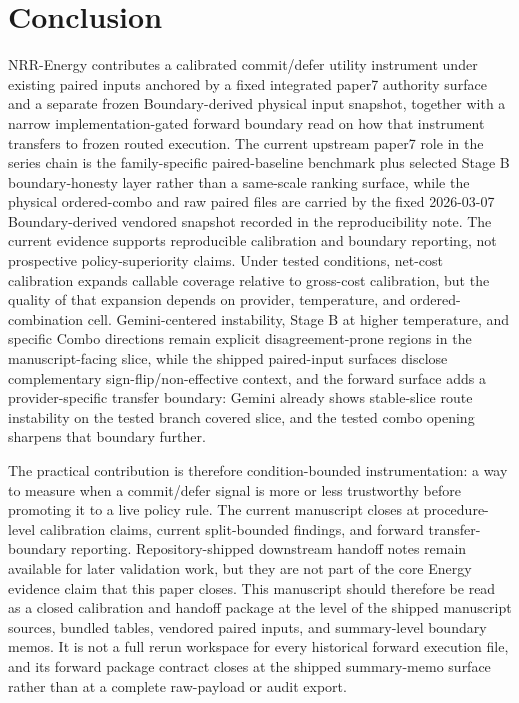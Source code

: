 \documentclass[11pt,a4paper]{article}
\begin{document}
\section{Conclusion}
\label{sec:conclusion}

NRR-Energy contributes a calibrated commit/defer utility instrument under existing paired inputs anchored by a fixed integrated paper7 authority surface and a separate frozen Boundary-derived physical input snapshot, together with a narrow implementation-gated forward boundary read on how that instrument transfers to frozen routed execution. The current upstream paper7 role in the series chain is the family-specific paired-baseline benchmark plus selected Stage B boundary-honesty layer rather than a same-scale ranking surface, while the physical ordered-combo and raw paired files are carried by the fixed 2026-03-07 Boundary-derived vendored snapshot recorded in the reproducibility note. The current evidence supports reproducible calibration and boundary reporting, not prospective policy-superiority claims. Under tested conditions, net-cost calibration expands callable coverage relative to gross-cost calibration, but the quality of that expansion depends on provider, temperature, and ordered-combination cell. Gemini-centered instability, Stage B at higher temperature, and specific Combo directions remain explicit disagreement-prone regions in the manuscript-facing slice, while the shipped paired-input surfaces disclose complementary sign-flip/non-effective context, and the forward surface adds a provider-specific transfer boundary: Gemini already shows stable-slice route instability on the tested branch covered slice, and the tested combo opening sharpens that boundary further.

The practical contribution is therefore condition-bounded instrumentation: a way to measure when a commit/defer signal is more or less trustworthy before promoting it to a live policy rule. The current manuscript closes at procedure-level calibration claims, current split-bounded findings, and forward transfer-boundary reporting. Repository-shipped downstream handoff notes remain available for later validation work, but they are not part of the core Energy evidence claim that this paper closes.
This manuscript should therefore be read as a closed calibration and handoff package
at the level of the shipped manuscript sources, bundled tables, vendored paired
inputs, and summary-level boundary memos. It is not a full rerun workspace for every
historical forward execution file, and its forward package contract closes at the
shipped summary-memo surface rather than at a complete raw-payload or audit export.
\end{document}
